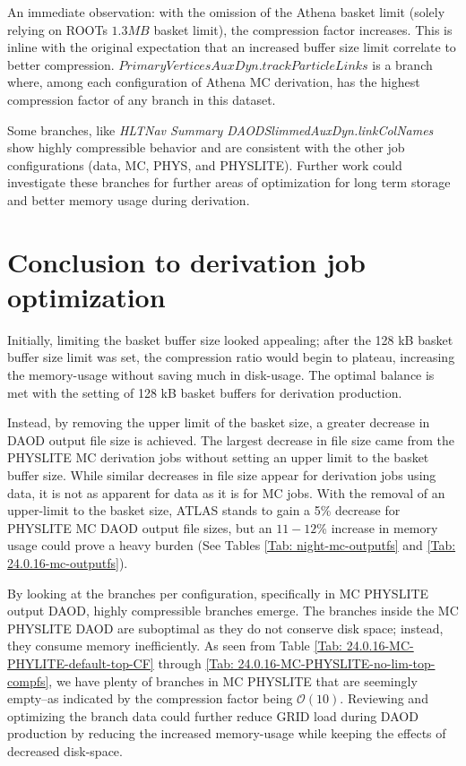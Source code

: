 



An immediate observation: with the omission of the Athena basket limit (solely relying on ROOTs $1.3 MB$ basket limit), the compression factor increases. 
This is inline with the original expectation that an increased buffer size limit correlate to better compression. 
$\textit{PrimaryVerticesAuxDyn.trackParticleLinks}$ is a branch where, among each configuration of Athena MC derivation, has the highest compression factor of any branch in this dataset. 

Some branches, like \textit{HLTNav Summary DAODSlimmedAuxDyn.linkColNames} show highly compressible behavior and are consistent with the other job configurations (data, MC, PHYS, and PHYSLITE). 
Further work could investigate these branches for further areas of optimization for long term storage and better memory usage during derivation.

\section{Conclusion to derivation job optimization}
\label{sec:DAODProd_Results_conclusion}
Initially, limiting the basket buffer size looked appealing; after the 128 kB basket buffer size limit was set, the compression ratio would begin to plateau, increasing the memory-usage without saving much in disk-usage. 
The optimal balance is met with the setting of 128 kB basket buffers for derivation production. 

Instead, by removing the upper limit of the basket size, a greater decrease in DAOD output file size is achieved. 
The largest decrease in file size came from the PHYSLITE MC derivation jobs without setting an upper limit to the basket buffer size. 
While similar decreases in file size appear for derivation jobs using data, it is not as apparent for data as it is for MC jobs. 
With the removal of an upper-limit to the basket size, ATLAS stands to gain a 5\% decrease for PHYSLITE MC DAOD output file sizes, but an $11 - 12$\% increase in memory usage could prove a heavy burden (See Tables \ref{Tab: night-mc-outputfs} and \ref{Tab: 24.0.16-mc-outputfs}).

By looking at the branches per configuration, specifically in MC PHYSLITE output DAOD, highly compressible branches emerge. 
The branches inside the MC PHYSLITE DAOD are suboptimal as they do not conserve disk space; instead, they consume memory inefficiently. 
As seen from Table \ref{Tab: 24.0.16-MC-PHYLITE-default-top-CF} through \ref{Tab: 24.0.16-MC-PHYSLITE-no-lim-top-compfs}, we have plenty of branches in MC PHYSLITE that are seemingly empty--as indicated by the compression factor being $\mathcal{O}(10)$. 
Reviewing and optimizing the branch data could further reduce GRID load during DAOD production by reducing the increased memory-usage while keeping the effects of decreased disk-space. 
